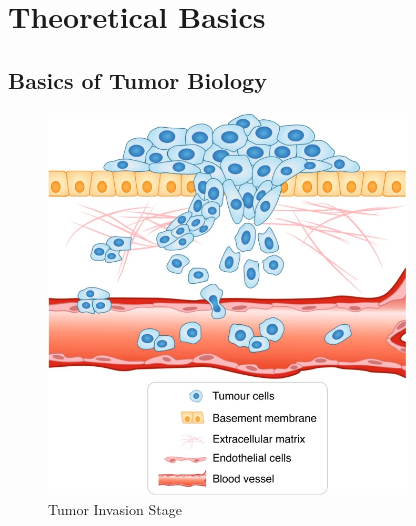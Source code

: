 \section{Theoretical Basics}
\subsection{Basics of Tumor Biology}
\begin{figure}[h]
    \centering
    \includegraphics[width=0.85\textwidth]{resources/images/tumour_invasion_stage.png}
    \caption{Tumor Invasion Stage}
    \label{fig:tumour_invasion_stage}
\end{figure}

